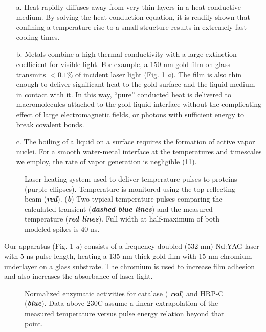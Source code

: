 \documentclass[a4paper,10pt,twoside]{article}
\begin{document}
\begin{itemize}
\item[a.] Heat rapidly diffuses away from very thin layers in a heat conductive medium. By solving the heat conduction equation, it is readily shown that confining a temperature rise to a small structure results in extremely fast cooling times.

\item[b.] Metals combine a high thermal conductivity with a large extinction coefficient for visible light. For example, a 150 nm gold film on glass transmits $<0.1\%$ of incident laser light (Fig. 1 {\it a}). The film is also thin enough to deliver significant heat to the gold surface and the liquid medium in contact with it. In this way, ``pure'' conducted heat is delivered to macromolecules attached to the gold-liquid interface without the complicating effect of large electromagnetic fields, or photons with sufficient energy to break covalent bonds.

\item[c.] The boiling of a liquid on a surface requires the formation of active vapor nuclei. For a smooth water-metal interface at the temperatures and timescales we employ, the rate of vapor generation is negligible (11).
\end{itemize}


\begin{figure}[t!]
\caption{Laser heating system used to deliver temperature pulses to proteins (purple ellipses). Temperature is monitored using the top reflecting beam ({\bfseries\itshape red}). ({\bfseries\itshape b}) Two typical temperature pulses comparing the calculated transient ({\bfseries\itshape dashed blue lines}) and the measured temperature ({\bfseries\itshape red lines}). Full width at half-maximum  of both modeled spikes is 40 ns.}
\end{figure}


Our apparatus (Fig. 1 {\it a}) consists of a frequency doubled (532 nm) Nd:YAG laser with 5 ns pulse length, heating a 135 nm thick gold film with 15 nm chromium underlayer on a glass substrate. The chromium is used to increase film adhesion and also increases the absorbance of laser light.

\begin{figure}[b!]
\caption{Normalized enzymatic activities for catalase ({\bfseries\itshape
red}) and HRP-C ({\bfseries\itshape blue}). Data above $\mbox{230}$\textdegree C assume a linear extrapolation of the measured temperature versus pulse energy relation beyond that point.}
\end{figure}
\end{document}
